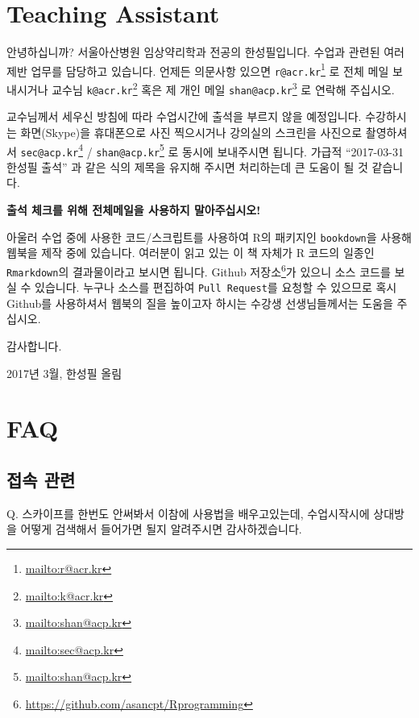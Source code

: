 \documentclass[11pt,]{krantz}
\renewenvironment{quote}{\begin{VF}}{\end{VF}}
\renewcommand{\href}[2]{#2\footnote{\url{#1}}}
\theoremstyle{definition}
\theoremstyle{definition}
\theoremstyle{remark}
\begin{document}
\section*{Teaching Assistant}\label{teaching-assistant}


안녕하십니까? 서울아산병원 임상약리학과 전공의 한성필입니다. 수업과
관련된 여러 제반 업무를 담당하고 있습니다. 언제든 의문사항 있으면
\href{mailto:r@acr.kr}{\nolinkurl{r@acr.kr}} 로 전체 메일 보내시거나
교수님 \href{mailto:k@acr.kr}{\nolinkurl{k@acr.kr}} 혹은 제 개인 메일
\href{mailto:shan@acp.kr}{\nolinkurl{shan@acp.kr}} 로 연락해 주십시오.

교수님께서 세우신 방침에 따라 수업시간에 출석을 부르지 않을 예정입니다.
수강하시는 화면(Skype)을 휴대폰으로 사진 찍으시거나 강의실의 스크린을
사진으로 촬영하셔서 \href{mailto:sec@acp.kr}{\nolinkurl{sec@acp.kr}} /
\href{mailto:shan@acp.kr}{\nolinkurl{shan@acp.kr}} 로 동시에 보내주시면
됩니다. 가급적 ``2017-03-31 한성필 출석'' 과 같은 식의 제목을 유지해
주시면 처리하는데 큰 도움이 될 것 같습니다.

\textbf{출석 체크를 위해 전체메일을 사용하지 말아주십시오!}

아울러 수업 중에 사용한 코드/스크립트를 사용하여 R의 패키지인
\texttt{bookdown}을 사용해 웹북을 제작 중에 있습니다. \citep{R-bookdown}
 여러분이 읽고 있는 이 책 자체가 R 코드의 일종인
\texttt{Rmarkdown}의 결과물이라고 보시면 됩니다.
\href{https://github.com/asancpt/Rprogramming}{Github 저장소}가 있으니
소스 코드를 보실 수 있습니다. 누구나 소스를 편집하여
\texttt{Pull\ Request}를 요청할 수 있으므로 혹시 Github를 사용하셔서
웹북의 질을 높이고자 하시는 수강생 선생님들께서는 도움을 주십시오.

감사합니다.

2017년 3월, 한성필 올림

\section*{FAQ}\label{faq}


\subsection*{접속 관련}\label{-}


\begin{quote}
Q. 스카이프를 한번도 안써봐서 이참에 사용법을 배우고있는데, 수업시작시에
상대방을 어떻게 검색해서 들어가면 될지 알려주시면 감사하겠습니다.
\end{quote}
\end{document}
